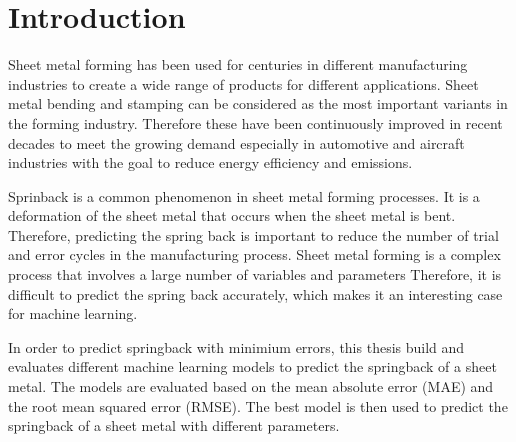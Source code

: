 \chapter{Introduction}

Sheet metal forming has been used for centuries in different manufacturing industries to create a wide range of products for different applications. 
Sheet metal bending and stamping can be considered as the most important variants in the forming industry. \cite[p. 1]{cruz_applicationmachinelearning_2021} 
Therefore these have been continuously improved in recent decades to meet the growing demand especially in  automotive and aircraft industries with the goal to reduce energy efficiency and emissions. \cite[p. 4]{zheng_reviewformingtechniques_2018}

Sprinback is a common phenomenon in sheet metal forming processes. It is a deformation of the sheet metal that occurs when the sheet metal is bent. Therefore, predicting the spring back is important to reduce the number of trial and error cycles in the manufacturing process. \cite[p. 1]{cruz_applicationmachinelearning_2021} 
Sheet metal forming is a complex process that involves a large number of variables and parameters Therefore, it is difficult to predict the spring back accurately, which makes it an interesting case for machine learning.

In order to predict springback with minimium errors, this thesis build and evaluates different machine learning models to predict the springback of a sheet metal. The models are evaluated based on the mean absolute error (MAE) and the root mean squared error (RMSE). The best model is then used to predict the springback of a sheet metal with different parameters. 

